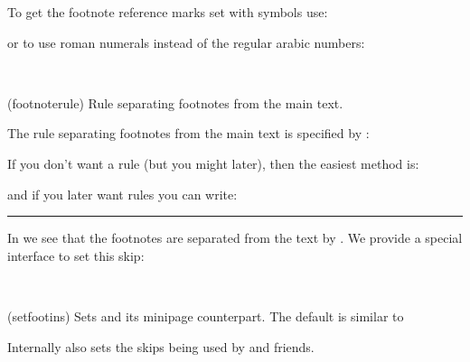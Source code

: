     To get the footnote reference marks set with
symbols use:
\begin{lcode}
\renewcommand*{\thefootnote}{\fnsymbol{footnote}}
\end{lcode}
or to use roman numerals instead of the regular arabic numbers:
\begin{lcode}
\renewcommand*{\thefootnote}{\roman{footnote}}
\end{lcode}

\begin{syntax}
\cmd{\footnoterule} \\
\end{syntax}
\glossary(footnoterule)%
{}%
{Rule separating footnotes from the main text.}

    The rule separating footnotes from the main text is specified 
by \cmd{\footnoterule}:
\begin{lcode}
\newcommand*{\footnoterule}{%
  \kern-3pt%
  \hrule width 0.4\columnwidth
  \kern 2.6pt}
\end{lcode}
If you don't want a rule (but you might later), then the easiest method is:
\begin{lcode}
\let\oldfootnoterule\footnoterule
\renewcommand*{\footnoterule}{}
\end{lcode}
and if you later want rules you can write:
\begin{lcode}
\let\footnoterule\oldfootnoterule
\end{lcode} 


\fancybreak{}


In  we see that the footnotes are separated from the text
by . We provide a special interface to set this skip:
\begin{syntax}
\cmd{\setfootins} \\
\end{syntax}
\glossary(setfootins)%
{}%
{Sets  and its minipage counterpart.}
The default is similar to
\begin{lcode}
  \setfootins{\bigskipamount}{\bigskipamount}
\end{lcode}
Internally \cmd{\setfootins} also sets the skips being used by
\cmd{\twocolumnfootnotes} and friends.





